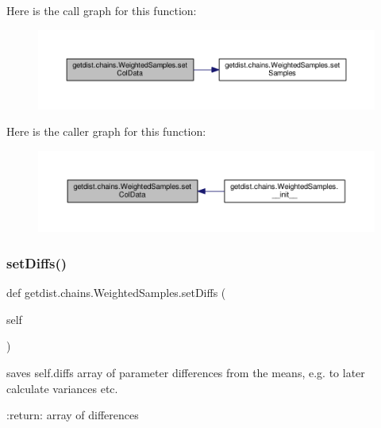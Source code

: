 Here is the call graph for this function\+:
\nopagebreak
\begin{figure}[H]
\begin{center}
\leavevmode
\includegraphics[width=350pt]{classgetdist_1_1chains_1_1WeightedSamples_a3d347a7823e4adc4e3f42bc5fd9a4162_cgraph}
\end{center}
\end{figure}
Here is the caller graph for this function\+:
\nopagebreak
\begin{figure}[H]
\begin{center}
\leavevmode
\includegraphics[width=350pt]{classgetdist_1_1chains_1_1WeightedSamples_a3d347a7823e4adc4e3f42bc5fd9a4162_icgraph}
\end{center}
\end{figure}
\mbox{\label{classgetdist_1_1chains_1_1WeightedSamples_aa76342740cc0252dbaa1ebbd8e254853}} 
\subsubsection{\texorpdfstring{set\+Diffs()}{setDiffs()}}
{\footnotesize\ttfamily def getdist.\+chains.\+Weighted\+Samples.\+set\+Diffs (\begin{DoxyParamCaption}\item[{}]{self }\end{DoxyParamCaption})}

\begin{DoxyVerb}saves self.diffs array of parameter differences from the means, e.g. to later calculate variances etc.

:return: array of differences
\end{DoxyVerb}
 

